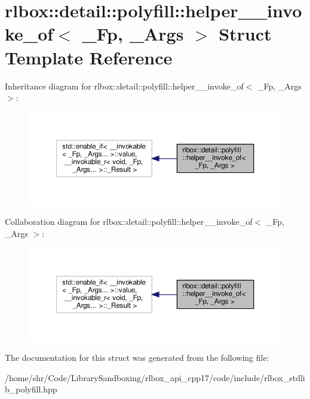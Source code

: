 \hypertarget{structrlbox_1_1detail_1_1polyfill_1_1helper____invoke__of}{}\section{rlbox\+:\+:detail\+:\+:polyfill\+:\+:helper\+\_\+\+\_\+invoke\+\_\+of$<$ \+\_\+\+Fp, \+\_\+\+Args $>$ Struct Template Reference}
\label{structrlbox_1_1detail_1_1polyfill_1_1helper____invoke__of}


Inheritance diagram for rlbox\+:\+:detail\+:\+:polyfill\+:\+:helper\+\_\+\+\_\+invoke\+\_\+of$<$ \+\_\+\+Fp, \+\_\+\+Args $>$\+:
\nopagebreak
\begin{figure}[H]
\begin{center}
\leavevmode
\includegraphics[width=350pt]{structrlbox_1_1detail_1_1polyfill_1_1helper____invoke__of__inherit__graph}
\end{center}
\end{figure}


Collaboration diagram for rlbox\+:\+:detail\+:\+:polyfill\+:\+:helper\+\_\+\+\_\+invoke\+\_\+of$<$ \+\_\+\+Fp, \+\_\+\+Args $>$\+:
\nopagebreak
\begin{figure}[H]
\begin{center}
\leavevmode
\includegraphics[width=350pt]{structrlbox_1_1detail_1_1polyfill_1_1helper____invoke__of__coll__graph}
\end{center}
\end{figure}


The documentation for this struct was generated from the following file\+:\begin{DoxyCompactItemize}
\item 
/home/shr/\+Code/\+Library\+Sandboxing/rlbox\+\_\+api\+\_\+cpp17/code/include/rlbox\+\_\+stdlib\+\_\+polyfill.\+hpp\end{DoxyCompactItemize}
